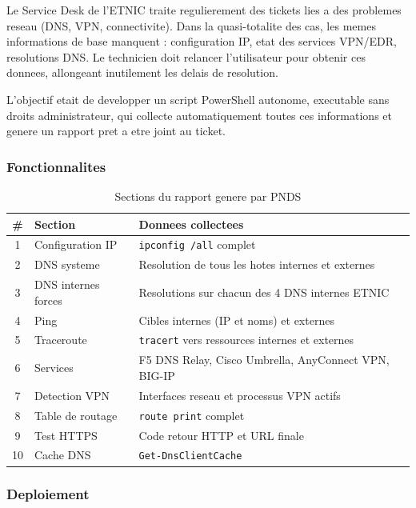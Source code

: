 \documentclass{rapport}
\begin{document}
Le Service Desk de l'ETNIC traite regulierement des tickets lies a des
problemes reseau (DNS, VPN, connectivite). Dans la quasi-totalite des cas,
les memes informations de base manquent : configuration IP, etat des
services VPN/EDR, resolutions DNS. Le technicien doit relancer l'utilisateur
pour obtenir ces donnees, allongeant inutilement les delais de resolution.

L'objectif etait de developper un script PowerShell autonome, executable
sans droits administrateur, qui collecte automatiquement toutes ces
informations et genere un rapport pret a etre joint au ticket.

\subsubsection{Fonctionnalites}

\begin{table}[H]
\centering
\begin{tabularx}{\linewidth}{clX}
\toprule
\textbf{\#} & \textbf{Section} & \textbf{Donnees collectees} \\
\midrule
1  & Configuration IP    & \texttt{ipconfig /all} complet \\
2  & DNS systeme         & Resolution de tous les hotes internes et externes \\
3  & DNS internes forces & Resolutions sur chacun des 4 DNS internes ETNIC \\
4  & Ping                & Cibles internes (IP et noms) et externes \\
5  & Traceroute          & \texttt{tracert} vers ressources internes et externes \\
6  & Services            & F5 DNS Relay, Cisco Umbrella, AnyConnect VPN, BIG-IP \\
7  & Detection VPN       & Interfaces reseau et processus VPN actifs \\
8  & Table de routage    & \texttt{route print} complet \\
9  & Test HTTPS          & Code retour HTTP et URL finale \\
10 & Cache DNS           & \texttt{Get-DnsClientCache} \\
\bottomrule
\end{tabularx}
\caption{Sections du rapport genere par PNDS}
\end{table}

\subsubsection{Deploiement}
\end{document}
